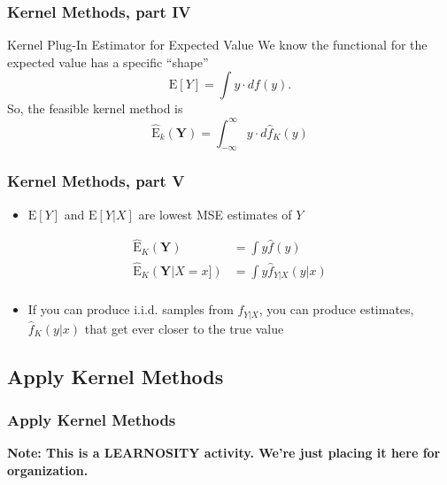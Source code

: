\documentclass[12pt, block=fill]{beamer}
\newcommand{\E}{\text{E}}
\newcommand{\bs}{\boldsymbol}
\begin{document}
\begin{frame}
  \frametitle{Kernel Methods, part IV}
    \begin{block}{Kernel Plug-In Estimator for Expected Value}
      We know the functional for the expected value has a specific
      ``shape'' \[\E[Y] = \int y\cdot df(y).\] So, the feasible kernel method is
    \[\hat{\E}_{k}(\bs Y) = \int_{-\infty}^{\infty} y \cdot d\hat{f}_{K}(y)\]
  \end{block} 
\end{frame}

\begin{frame}[t]
  \frametitle{Kernel Methods, part V}
  \begin{itemize}
  \item $\E[Y]$ and $\E[Y|X]$ are lowest MSE estimates of $Y$
  \end{itemize}
  \begin{align*}
    \hat{\E}_{K}(\bs Y) &= \int y\hat{f}(y) \\ 
    \hat{\E}_{K}(\bs Y|X=x]) &= \int y \hat{f}_{Y|X}(y|x) \\
  \end{align*}
  \begin{itemize}
  \item If you can produce i.i.d. samples from $f_{Y|X}$, you can
    produce estimates, $\hat{f}_{K}(y|x)$ that get ever closer to the
    true value
  \end{itemize}
\end{frame}



\subsection{Apply Kernel Methods}



\begin{frame}
  \frametitle{Apply Kernel Methods}
  \textbf{Note: This is a LEARNOSITY activity. We're just placing it
    here for organization.} 
\end{frame}
\end{document}

